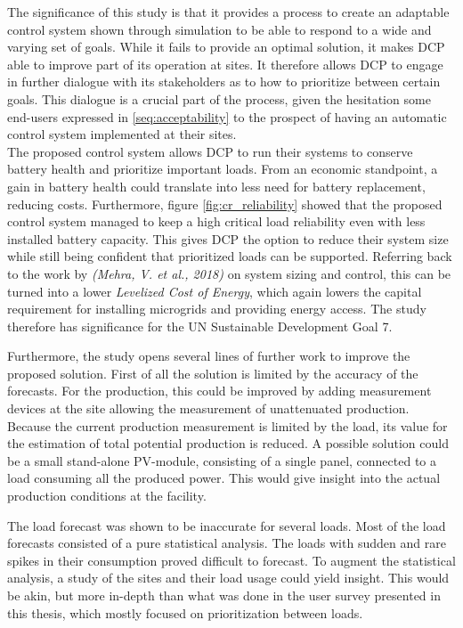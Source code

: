 The significance of this study is that it provides a process to create an adaptable control system shown through simulation to be able to respond to a wide and varying set of goals. While it fails to provide an optimal solution, it makes DCP able to improve part of its operation at sites. It therefore allows DCP to engage in further dialogue with its stakeholders as to how to prioritize between certain goals. This dialogue is a crucial part of the process, given the hesitation some end-users expressed in \ref{seq:acceptability} to the prospect of having an automatic control system implemented at their sites.\\

The proposed control system allows DCP to run their systems to conserve battery health and prioritize important loads. From an economic standpoint, a gain in battery health could translate into less need for battery replacement, reducing costs. Furthermore, figure \ref{fig:cr_reliability} showed that the proposed control system managed to keep a high critical load reliability even with less installed battery capacity. This gives DCP the option to reduce their system size while still being confident that prioritized loads can be supported. Referring back to the work by \textit{(Mehra, V. et al., 2018)} on system sizing and control, this can be turned into a lower \textit{Levelized Cost of Energy}, which again lowers the capital requirement for installing microgrids and providing energy access. The study therefore has significance for the UN Sustainable Development Goal 7\cite{un_sdg_7}.

Furthermore, the study opens several lines of further work to improve the proposed solution. First of all the solution is limited by the accuracy of the forecasts. For the production, this could be improved by adding measurement devices at the site allowing the measurement of unattenuated production. Because the current production measurement is limited by the load, its value for the estimation of total potential production is reduced. A possible solution could be a small stand-alone PV-module, consisting of a single panel, connected to a load consuming all the produced power. This would give insight into the actual production conditions at the facility. 

The load forecast was shown to be inaccurate for several loads. Most of the load forecasts consisted of a pure statistical analysis. The loads with sudden and rare spikes in their consumption proved difficult to forecast. To augment the statistical analysis, a study of the sites and their load usage could yield insight. This would be akin, but more in-depth than what was done in the user survey presented in this thesis, which mostly focused on prioritization between loads. 

